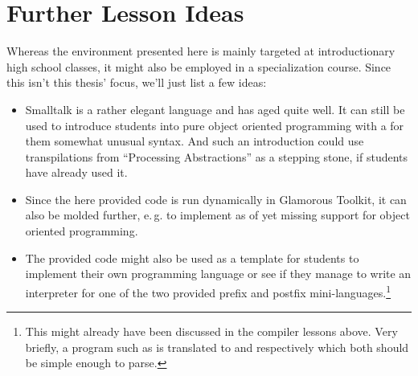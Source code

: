 \section{Further Lesson Ideas} \label{sc_lesson_other}

Whereas the environment presented here is mainly targeted at introductionary high school classes, it might also be employed in a specialization course. Since this isn't this thesis' focus, we'll just list a few ideas:

\begin{itemize}
\item Smalltalk is a rather elegant language and has aged quite well. It can still be used to introduce students into pure object oriented programming with a for them somewhat unusual syntax. And such an introduction could use transpilations from ``Processing Abstractions'' as a stepping stone, if students have already used it.
\item Since the here provided code is run dynamically in Glamorous Toolkit, it can also be molded further, e.\,g. to implement as of yet missing support for object oriented programming.
\item The provided code might also be used as a template for students to implement their own programming language or see if they manage to write an interpreter for one of the two provided prefix and postfix mini-languages.\footnote{This might already have been discussed in the compiler lessons above. Very briefly, a program such as  is translated to  and  respectively which both should be simple enough to parse.}
\end{itemize}
